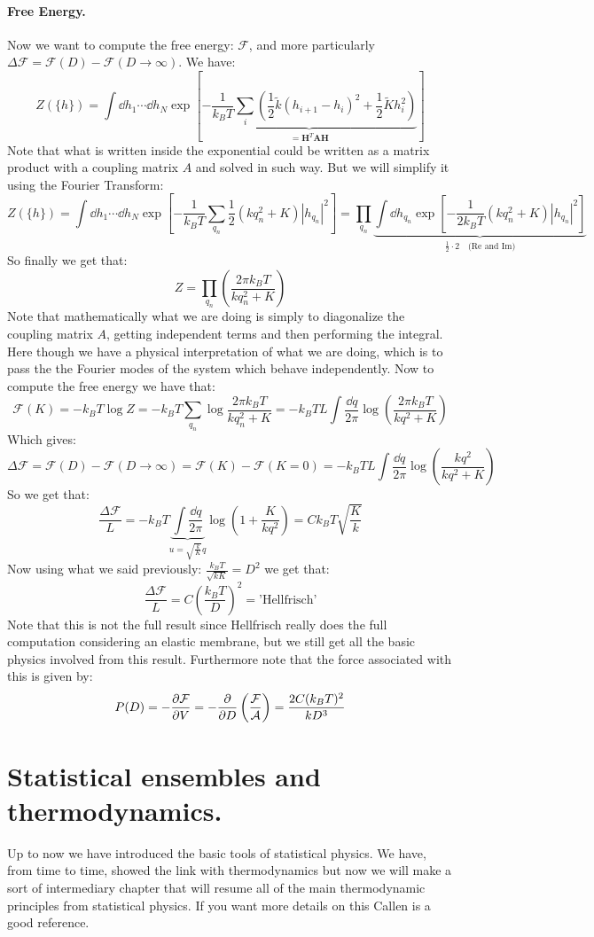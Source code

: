 \documentclass[10pt,a4paper]{book}
\begin{document}
\subsubsection{Free Energy.}
Now we want to compute the free energy: $\mathcal{F}$, and more particularly $\Delta \mathcal{F} = \mathcal{F}(D) - \mathcal{F}(D \to \infty)$. We have:
\[
Z(\{h\}) = \int \dd h_1 \cdots \dd h_N \exp[\underbrace{-\frac{1}{k_B T} \sum_i \left( \frac{1}{2} \tilde{k}(h_{i+1}-h_i)^2 + \frac{1}{2}\tilde{K} h_i^2 \right)}_{= \mathbf{H}^T \mathbf{A} \mathbf{H}}]
\]  
Note that what is written inside the exponential could be written as a matrix product with a coupling matrix $A$ and solved in such way. But we will simplify it using the Fourier Transform:
\[
Z(\{h\}) = \int \dd h_1 \cdots \dd h_N \exp[ -\frac{1}{k_B T} \sum_{q_n} \frac{1}{2}(kq_n^2 + K)|h_{q_n}|^2 ] = \prod_{q_n} \underbrace{\int \dd h_{q_n} \exp[ -\frac{1}{2 k_B T} (kq_n^2 + K)|h_{q_n}|^2 ]}_{\frac{1}{2} \cdot 2 \quad \text{(Re and Im)}}
\]
So finally we get that:
\[
Z = \prod_{q_n} \left(\frac{2\pi k_B T}{k q_n^2 + K}\right)
\]
Note that mathematically what we are doing is simply to diagonalize the coupling matrix $A$, getting independent terms and then performing the integral. Here though we have a physical interpretation of what we are doing, which is to pass the the Fourier modes of the system which behave independently. Now to compute the free energy we have that:
\[
\mathcal{F}(K) = - k_B T \log Z = - k_B T \sum_{q_n} \log \frac{2 \pi k_B T}{k q_n^2 + K} = - k_B T L \int \frac{\dd q}{2\pi} \log \left(\frac{2\pi k_B T}{kq^2 + K}\right)
\]
Which gives:
\[
\Delta \mathcal{F} = \mathcal{F}(D) - \mathcal{F}(D \to \infty) = \mathcal{F}(K) - \mathcal{F}(K = 0) = - k_B T L \int \frac{\dd q}{2 \pi} \log(\frac{kq^2}{kq^2 + K})
\]
So we get that:
\[
\frac{\Delta \mathcal{F}}{L} = -k_B T \underbrace{\int \frac{\dd q}{2 \pi}}_{u = \sqrt{\frac{k}{K}}q} \log(1 + \frac{K}{kq^2}) = C k_B T \sqrt{\frac{K}{k}}
\]
Now using what we said previously: $\frac{k_B T}{\sqrt{k K}} = D^2$ we get that:
\[
\frac{\Delta \mathcal{F}}{L} = C \left(\frac{k_B T}{D}\right)^2 = \text{'Hellfrisch'}
\]
Note that this is not the full result since Hellfrisch really does the full computation considering an elastic membrane, but we still get all the basic physics involved from this result. Furthermore note that the force associated with this is given by:
\[
P(D) = - \pdv{\mathcal{F}}{V} = -\pdv{}{D} \left(\frac{\mathcal{F}}{\mathcal{A}}\right) = \frac{2 C (k_B T)^2}{k D^3}
\]

\chapter{Statistical ensembles and thermodynamics.}
Up to now we have introduced the basic tools of statistical physics. We have, from time to time, showed the link with thermodynamics but now we will make a sort of intermediary chapter that will resume all of the main thermodynamic principles from statistical physics. If you want more details on this Callen is a good reference.
\end{document}
